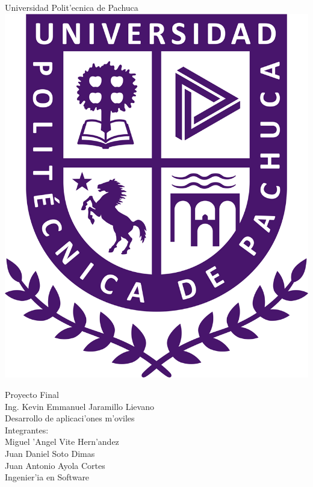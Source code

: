 \begin{titlepage}
	\begin{center}
		\sc \LARGE Universidad Polit'ecnica de Pachuca\\
		\bigskip
		\includegraphics[scale=0.2]{logo.png}
	\end{center}
	\bigskip
	\begin{center}
		\huge{Proyecto Final\\}
		\vspace*{1cm}
		\sc \LARGE Ing. Kevin Emmanuel Jaramillo Lievano\\
		\vspace*{0.5cm}
		\sc \LARGE Desarrollo de aplicaci'ones m'oviles\\
		\vspace*{0.5cm}
		\sc \LARGE Integrantes: \\
		\sc \Large Miguel 'Angel Vite Hern'andez \\
		\sc \Large Juan Daniel Soto Dimas \\
		\sc \Large Juan Antonio Ayola Cortes \\
		\vfill
		\sc Ingenier'ia en Software
	\end{center}
\end{titlepage}